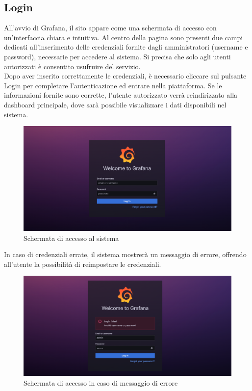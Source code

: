 \documentclass[10pt]{article}
\begin{document}
\begin{justify}
\subsection{Login}
All'avvio di Grafana, il sito appare come una schermata di accesso con un'interfaccia chiara e intuitiva. Al centro della pagina sono presenti due campi dedicati all'inserimento delle credenziali fornite dagli amministratori (username e password), necessarie per accedere al sistema. Si precisa che solo agli utenti autorizzati è consentito usufruire del servizio.\\
Dopo aver inserito correttamente le credenziali, è necessario cliccare sul pulsante Login per completare l'autenticazione ed entrare nella piattaforma. Se le informazioni fornite sono corrette, l'utente autorizzato verrà reindirizzato alla dashboard principale, dove sarà possibile visualizzare i dati disponibili nel sistema.\\
\begin{figure}[H]
    \centering
    \includegraphics[width=0.7\linewidth]{login.png}
    \caption{Schermata di accesso al sistema}
\end{figure}
\noindent
In caso di credenziali errate, il sistema mostrerà un messaggio di errore, offrendo all'utente la possibilità di reimpostare le credenziali.
\begin{figure}[H]
    \centering
    \includegraphics[width=0.7\linewidth]{error.png}
    \caption{Schermata di accesso in caso di messaggio di errore}
\end{figure}


\end{justify}
\end{document}
